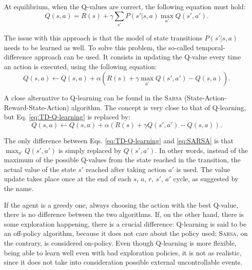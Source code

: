 \documentclass[a4paper, 12pt]{article}
\numberwithin{equation}{section}
\begin{document}
At equilibrium, when the Q-values are correct, the following equation must hold:
\begin{equation}\label{eq:equilibrium}
	Q\left(s,a\right)=R\left(s\right)+\gamma\sum_{s'}P\left(s'|s,a\right)\max_{a'}Q\left(s',a'\right).
\end{equation}

The issue with this approach is that the model of state transitions $P\left(s'|s,a\right)$ needs to be learned as well. To solve this problem, the so-called temporal-difference approach can be used. It consists in updating the Q-value every time an action is executed, using the following equation:
\begin{equation}\label{eq:TD-Q-learning}
	Q\left(s,a\right) \leftarrow Q\left(s,a\right) + \alpha\left(R\left(s\right)+\gamma\max_{a'}Q\left(s',a'\right)-Q\left(s,a\right)\right).
\end{equation}

A close alternative to Q-learning can be found in the \textsc{Sarsa} (State-Action-Reward-State-Action) algorithm. The concept is very close to that of Q-learning, but Eq. \eqref{eq:TD-Q-learning} is replaced by:
\begin{equation}\label{eq:SARSA}
	Q\left(s,a\right) \leftarrow Q\left(s,a\right) + \alpha\left(R\left(s\right)+\gamma Q\left(s',a'\right)-Q\left(s,a\right)\right).
\end{equation}

The only difference between Eqs. \eqref{eq:TD-Q-learning} and \eqref{eq:SARSA} is that $\max_{a'}Q\left(s',a'\right)$ is simply replaced by $Q\left(s',a'\right)$. In other words, instead of the maximum of the possible Q-values from the state reached in the transition, the actual value of the state $s'$ reached after taking action $a'$ is used. The value update takes place once at the end of each $s$, $a$, $r$, $s'$, $a'$ cycle, as suggested by the name.

If the agent is a greedy one, always choosing the action with the best Q-value, there is no difference between the two algorithms. If, on the other hand, there is some exploration happening, there is a crucial difference: Q-learning is said to be an off-policy algorithm, because it does not care about the policy used; \textsc{Sarsa}, on the contrary, is considered on-policy. Even though Q-learning is more flexible, being able to learn well even with bad exploration policies, it is not as realistic, since it does not take into consideration possible external uncontrollable events.
\end{document}

